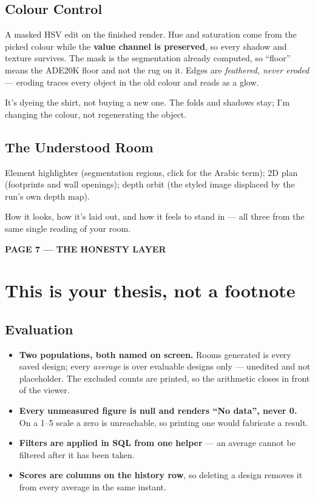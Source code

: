 \documentclass[10.5pt,a4paper]{article}
\newcommand{\pagelabel}[2]{%
  {\sffamily\bfseries\scriptsize\color{brass}\MakeUppercase{Page #1 --- #2}}\par\vspace{0.2em}}
\begin{document}
\subsection*{Colour Control}
A masked HSV edit on the finished render. Hue and saturation come from the picked colour while the
\textbf{value channel is preserved}, so every shadow and texture survives. The mask is the
segmentation already computed, so ``floor'' means the ADE20K floor and not the rug on it. Edges are
\emph{feathered, never eroded} --- eroding traces every object in the old colour and reads as a glow.
\begin{sayit}
It's dyeing the shirt, not buying a new one. The folds and shadows stay; I'm changing the colour,
not regenerating the object.
\end{sayit}

\subsection*{The Understood Room}
Element highlighter (segmentation regions, click for the Arabic term); 2D plan (footprints and wall
openings); depth orbit (the styled image displaced by the run's own depth map).
\begin{sayit}
How it looks, how it's laid out, and how it feels to stand in --- all three from the same single
reading of your room.
\end{sayit}

\newpage
\pagelabel{7}{the honesty layer}
\section*{This is your thesis, not a footnote}

\subsection*{Evaluation}
\begin{itemize}[leftmargin=1.1em,itemsep=1pt]
  \item \textbf{Two populations, both named on screen.} Rooms generated is every saved design; every
        \emph{average} is over evaluable designs only --- unedited and not placeholder. The excluded
        counts are printed, so the arithmetic closes in front of the viewer.
  \item \textbf{Every unmeasured figure is null and renders ``No data'', never 0.} On a 1--5 scale a
        zero is unreachable, so printing one would fabricate a result.
  \item \textbf{Filters are applied in SQL from one helper} --- an average cannot be filtered after
        it has been taken.
  \item \textbf{Scores are columns on the history row}, so deleting a design removes it from every
        average in the same instant.
\end{itemize}
\end{document}
